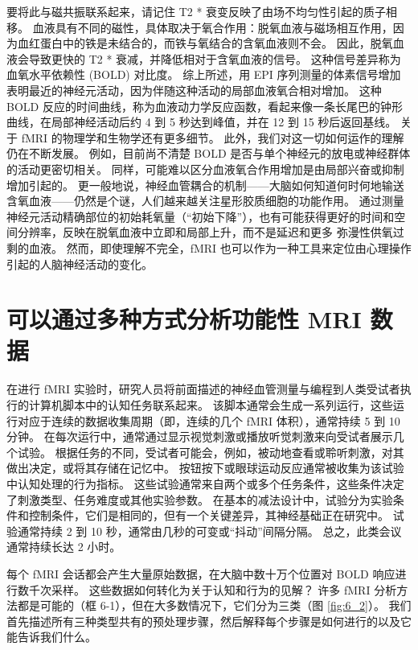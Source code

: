 要将此与磁共振联系起来，请记住 T2 * 衰变反映了由场不均匀性引起的质子相移。 
血液具有不同的磁性，具体取决于氧合作用：脱氧血液与磁场相互作用，因为血红蛋白中的铁是未结合的，而铁与氧结合的含氧血液则不会。 
因此，脱氧血液会导致更快的 T2 * 衰减，并降低相对于含氧血液的信号。 
这种信号差异称为血氧水平依赖性 (BOLD) 对比度。 
综上所述，用 EPI 序列测量的体素信号增加表明最近的神经元活动，因为伴随这种活动的局部血液氧合相对增加。 
这种 BOLD 反应的时间曲线，称为血液动力学反应函数，看起来像一条长尾巴的钟形曲线，在局部神经活动后约 4 到 5 秒达到峰值，并在 12 到 15 秒后返回基线。
关于 fMRI 的物理学和生物学还有更多细节。 
此外，我们对这一切如何运作的理解仍在不断发展。 
例如，目前尚不清楚 BOLD 是否与单个神经元的放电或神经群体的活动更密切相关。 
同样，可能难以区分血液氧合作用增加是由局部兴奋或抑制增加引起的。 
更一般地说，神经血管耦合的机制——大脑如何知道何时何地输送含氧血液——仍然是个谜，人们越来越关注星形胶质细胞的功能作用。 
通过测量神经元活动精确部位的初始耗氧量（“初始下降”），也有可能获得更好的时间和空间分辨率，反映在脱氧血液中立即和局部上升，而不是延迟和更多 弥漫性供氧过剩的血液。 
然而，即使理解不完全，fMRI 也可以作为一种工具来定位由心理操作引起的人脑神经活动的变化。


\section{可以通过多种方式分析功能性 MRI 数据}
在进行 fMRI 实验时，研究人员将前面描述的神经血管测量与编程到人类受试者执行的计算机脚本中的认知任务联系起来。 
该脚本通常会生成一系列运行，这些运行对应于连续的数据收集周期（即，连续的几个 fMRI 体积），通常持续 5 到 10 分钟。 
在每次运行中，通常通过显示视觉刺激或播放听觉刺激来向受试者展示几个试验。 
根据任务的不同，受试者可能会，例如，被动地查看或聆听刺激，对其做出决定，或将其存储在记忆中。 
按钮按下或眼球运动反应通常被收集为该试验中认知处理的行为指标。 
这些试验通常来自两个或多个任务条件，这些条件决定了刺激类型、任务难度或其他实验参数。 
在基本的减法设计中，试验分为实验条件和控制条件，它们是相同的，但有一个关键差异，其神经基础正在研究中。 
试验通常持续 2 到 10 秒，通常由几秒的可变或“抖动”间隔分隔。 
总之，此类会议通常持续长达 2 小时。


每个 fMRI 会话都会产生大量原始数据，在大脑中数十万个位置对 BOLD 响应进行数千次采样。 
这些数据如何转化为关于认知和行为的见解？ 
许多 fMRI 分析方法都是可能的（框 6-1），但在大多数情况下，它们分为三类（图 \ref{fig:6_2}）。 
我们首先描述所有三种类型共有的预处理步骤，然后解释每个步骤是如何进行的以及它能告诉我们什么。


